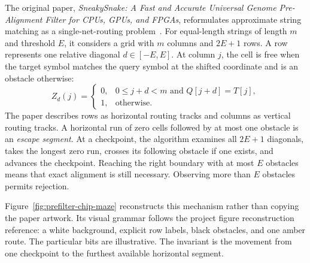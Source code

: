 The original paper, \emph{SneakySnake: A Fast and Accurate Universal Genome
Pre-Alignment Filter for CPUs, GPUs, and FPGAs}, reformulates approximate
string matching as a single-net-routing
problem~\cite{sneakysnake_paper}.  For equal-length strings of length \(m\) and
threshold \(E\), it considers a grid with \(m\) columns and \(2E+1\) rows.  A
row represents one relative diagonal
\(d\in[-E,E]\).  At column \(j\), the cell is free when the target symbol
matches the query symbol at the shifted coordinate and is an obstacle
otherwise:
\[
 Z_d(j) =
 \begin{cases}
 0, & 0\le j+d<m \text{ and } Q[j+d]=T[j],\\
 1, & \text{otherwise.}
 \end{cases}
\]
The paper describes rows as horizontal routing tracks and columns as vertical
routing tracks.  A horizontal run of zero cells followed by at most one
obstacle is an \emph{escape segment}.  At a checkpoint, the algorithm examines
all \(2E+1\) diagonals, takes the longest zero run, crosses its following
obstacle if one exists, and advances the checkpoint.  Reaching the right
boundary with at most \(E\) obstacles means that exact alignment is still
necessary.  Observing more than \(E\) obstacles permits rejection.

Figure~\ref{fig:prefilter-chip-maze} reconstructs this mechanism rather than
copying the paper artwork.  Its visual grammar follows the project figure
reconstruction reference: a white background, explicit row labels, black
obstacles, and one amber route.  The particular bits are illustrative.  The
invariant is the movement from one checkpoint to the furthest available
horizontal segment.

